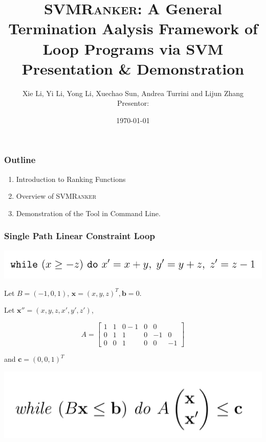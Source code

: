 \documentclass[11pt]{beamer}
\title{\textsc{SVMRanker}: A General Termination Aalysis Framework of Loop Programs via SVM\\
Presentation \& Demonstration}
\date{\today}
\author{Xie Li, Yi Li, Yong Li, Xuechao Sun, Andrea Turrini and Lijun Zhang\\ Presentor:}
\begin{document}
\maketitle

\begin{frame}\frametitle{Outline}
\begin{enumerate}
\item Introduction to Ranking Functions 
\item Overview of \textsc{SVMRanker}

\item Demonstration of the Tool in Command Line.
\end{enumerate}

\end{frame}
\begin{frame}\frametitle{Single Path Linear Constraint Loop}{\scriptsize
\begin{example}
\begin{center}

\includegraphics[scale = 0.4]{loopExample.png}


\end{center}


Let $B = (-1, 0, 1)$, $\textbf{x} = (x, y, z)^T, \textbf{b} = 0$.

Let $\textbf{x}'' = (x, y, z, x', y', z')$, 

\begin{equation}
A = \left[
\begin{array}{cccccc}
     1 &1 &0 -1 & 0 & 0 \\
     0 & 1 & 1 & 0 & -1 & 0 \\
     0& 0 & 1 & 0 & 0 & -1
\end{array}
\right]
\end{equation}

and $\textbf{c} = (0, 0, 1)^T$


\end{example}




\begin{definition}[SLC]
\includegraphics[scale = 0.28]{1.PNG}



\end{definition}}
\end{frame}
\end{document}
